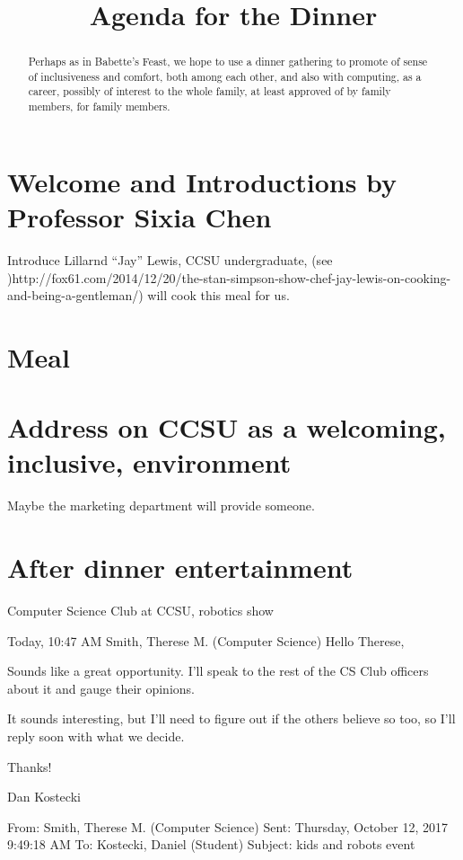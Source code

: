 \documentclass[]{article}
\title{Agenda for the Dinner}
\author{}
\begin{document}
\maketitle

\begin{abstract}
Perhaps as in Babette's Feast, we hope to use a dinner gathering to promote of sense of inclusiveness and comfort, both among each other, and also with computing, as a career, possibly of interest to the whole family, at least approved of by family members, for family members.
\end{abstract}

\section{Welcome and Introductions by Professor Sixia Chen}
Introduce Lillarnd ``Jay'' Lewis, CCSU undergraduate, (see )http://fox61.com/2014/12/20/the-stan-simpson-show-chef-jay-lewis-on-cooking-and-being-a-gentleman/)
will cook this meal for us.

\section{Meal}

\section{Address on CCSU as a welcoming, inclusive, environment}
Maybe the marketing department will provide someone.

\section{After dinner entertainment}
Computer Science Club at CCSU, robotics show

Today, 10:47 AM
Smith, Therese M. (Computer Science) 
Hello Therese, 

Sounds like a great opportunity. I'll speak to the rest of the CS Club officers about it and gauge their opinions.

It sounds interesting, but I'll need to figure out if the others believe so too, so I'll reply soon with what we decide.

Thanks!

Dan Kostecki

From: Smith, Therese M. (Computer Science)
Sent: Thursday, October 12, 2017 9:49:18 AM
To: Kostecki, Daniel (Student)
Subject: kids and robots event
\end{document}
